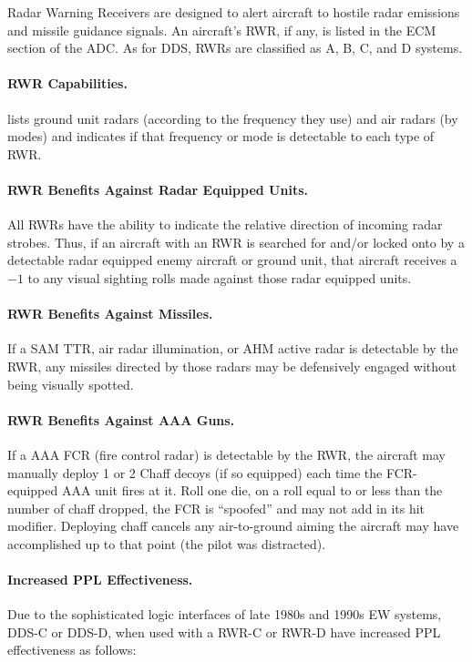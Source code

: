 Radar Warning Receivers are designed to alert aircraft to hostile radar emissions and missile guidance signals. An aircraft's RWR, if any, is listed in the ECM section of the ADC. As for DDS, RWRs are classified as A, B, C, and D systems.

\paragraph{RWR Capabilities.}  lists ground unit radars (according to the frequency they use) and air radars (by modes) and indicates if that frequency or mode is detectable to each type of RWR.

\paragraph{RWR Benefits Against Radar Equipped Units.} All RWRs have the ability to indicate the relative direction of incoming radar strobes. Thus, if an aircraft with an RWR is searched for and/or locked onto by a detectable radar equipped enemy aircraft or ground unit, that aircraft receives a $-1$ to any visual sighting rolls made against those radar equipped units.

\paragraph{RWR Benefits Against Missiles.} If a SAM TTR, air radar illumination, or AHM active radar is detectable by the RWR, any missiles directed by those radars may be defensively engaged without being visually spotted.

\paragraph{RWR Benefits Against AAA Guns.} If a AAA FCR (fire control radar) is detectable by the RWR, the aircraft may manually deploy 1 or 2 Chaff decoys (if so equipped) each time the FCR-equipped AAA unit fires at it. Roll one die, on a roll equal to or less than the number of chaff dropped, the FCR is “spoofed” and may not add in its hit modifier. Deploying chaff cancels any air-to-ground aiming the aircraft may have accomplished up to that point (the pilot was distracted).

\paragraph{Increased PPL Effectiveness.} Due to the sophisticated logic interfaces of late 1980s and 1990s EW systems, DDS-C or DDS-D, when used with a RWR-C or RWR-D have increased PPL effectiveness as follows:

